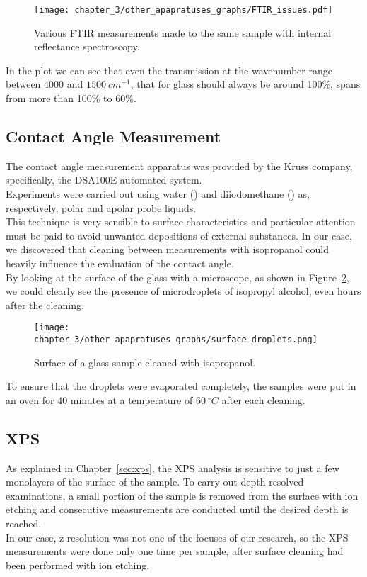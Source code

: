 \begin{figure}[H]
    \centering
    \texttt{[image: chapter\_3/other\_apapratuses\_graphs/FTIR\_issues.pdf]} 
    \vspace*{-30pt}
    \caption{Various FTIR measurements made to the same sample with internal reflectance spectroscopy.}
    \label{fig:ftir_issues}
\end{figure}

In the plot we can see that even the transmission at the wavenumber range between 4000 and $1500\: cm^{-1}$, that for glass should always be around 100\%, spans from more than 100\% to 60\%.

\subsection{Contact Angle Measurement}
\label{subsec:contact_angle_setup}
The contact angle measurement apparatus was provided by the Kruss company, specifically, the DSA100E automated system.
\\
Experiments were carried out using water () and diiodomethane () as, respectively, polar and apolar probe liquids.
\\
This technique is very sensible to surface characteristics and particular attention must be paid to avoid unwanted depositions of external substances. In our case, we discovered that cleaning between measurements with isopropanol could heavily influence the evaluation of the contact angle.  
\\ 
By looking at the surface of the glass with a microscope, as shown in Figure~\ref{fig:surface_droplets}, we could clearly see the presence of microdroplets of isopropyl alcohol, even hours after the cleaning. 

\begin{figure}[H]
    \centering
    \texttt{[image: chapter\_3/other\_apapratuses\_graphs/surface\_droplets.png]} 
    \caption{Surface of a glass sample cleaned with isopropanol.}
    \label{fig:surface_droplets}
\end{figure}

To ensure that the droplets were evaporated completely, the samples were put in an oven for 40 minutes at a temperature of $60\: ^{\circ} C$ after each cleaning.

\subsection{XPS}
\label{subsec:xps_setup}
As explained in Chapter~\ref{sec:xps}, the XPS analysis is sensitive to just a few monolayers of the surface of the sample. To carry out depth resolved examinations, a small portion of the sample is removed from the surface with ion etching and consecutive measurements are conducted until the desired depth is reached.
\\
In our case, z-resolution was not one of the focuses of our research, so the XPS measurements were done only one time per sample, after surface cleaning had been performed with ion etching.


